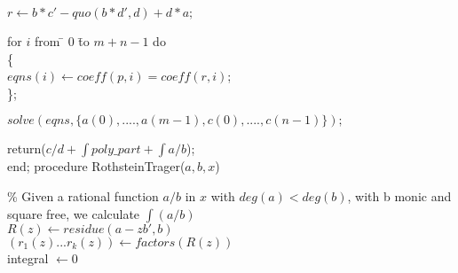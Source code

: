 $r \leftarrow b*c'-quo(b*d',d)+d*a; $\\
\begin{tabbing}
for $i$ from \= $0$ \=  to $m+n-1$ do \\
\> \{ \\
\> \>   $  eqns(i) \leftarrow coeff(p,i)=coeff(r,i)$; \\
\> \};
\end{tabbing}

$solve(eqns,\{a(0),....,a(m-1),c(0),....,c(n-1)\});$

return($c/d+\int poly\_part + \int a/b$);
\\
end;
\newpage
procedure RothsteinTrager($a,b,x$)

\% Given a rational function $a/b$ in $x$ with $deg(a)<deg(b)$, with b monic and square free, we calculate $ \int(a/b)$ \\
$R(z) \leftarrow residue(a-zb',b)$ \\
$(r_{1}(z)...r_{k}(z)) \leftarrow factors(R(z))$ \\
integral $\leftarrow 0 $\\
